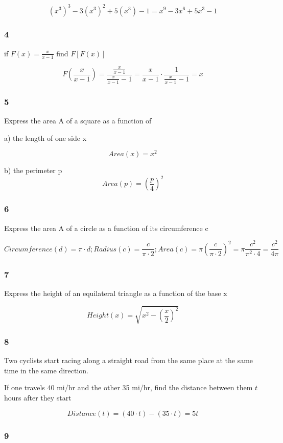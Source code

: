 \documentclass[]{report}
\begin{document}
\[
(x^3)^3 - 3(x^3)^2 + 5(x^3) - 1 = x^9 - 3x^6 + 5x^3 - 1
\]

\subsubsection{4}

if $F(x) = \frac{x}{x-1}$ find $F[F(x)]$


\[
F(\frac{x}{x-1}) = \frac{\frac{x}{x-1}}{\frac{x}{x-1}-1} = \frac{x}{x-1} \cdot \frac{1}{\frac{x}{x-1}-1} =  x
\]

\subsubsection{5}

Express the area A of a square as a function of 

a) the length of one side x

\[
Area(x) = x^2
\]

b) the perimeter p
\[
Area(p) = (\frac{p}{4})^2
\]

\subsubsection{6}

Express the area A of a circle as a function of its circumference c

\[
Circumference(d) = \pi \cdot d;
Radius(c) = \frac{c}{\pi \cdot 2};
Area(c) = \pi (\frac{c}{\pi \cdot 2})^2 = \pi \frac{c^2}{\pi^2 \cdot 4} = \frac{c^2}{4\pi}
\]

\subsubsection{7} 
Express the height of an equilateral triangle as a function of the base x

\[
Height(x) = \sqrt{x^2 - (\frac{x}{2})^2}
\]

\subsubsection{8}
Two cyclists start racing along a straight road from the same place at the same time in the same direction.

If one travels 40 mi/hr and the other 35 mi/hr, find the distance between them $t$ hours after they start

\[
Distance(t) = (40\cdot t) - (35\cdot t) = 5t
\]

\subsubsection{9}
\end{document}
